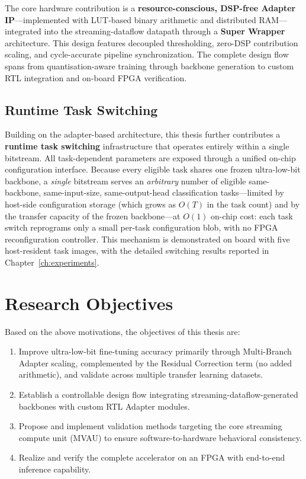 \documentclass[12pt, a4paper]{report}
\numberwithin{equation}{chapter}
\numberwithin{figure}{chapter}
\numberwithin{table}{chapter}
\numberwithin{algorithm}{chapter}
\begin{document}
The core hardware contribution is a \textbf{resource-conscious, DSP-free Adapter IP}---implemented with LUT-based binary arithmetic and distributed RAM---integrated into the streaming-dataflow datapath through a \textbf{Super Wrapper} architecture. This design features decoupled thresholding, zero-DSP contribution scaling, and cycle-accurate pipeline synchronization. The complete design flow spans from quantisation-aware training through backbone generation to custom RTL integration and on-board FPGA verification.

\subsection{Runtime Task Switching}

Building on the adapter-based architecture, this thesis further contributes a \textbf{runtime task switching} infrastructure that operates entirely within a single bitstream. All task-dependent parameters are exposed through a unified on-chip configuration interface. Because every eligible task shares one frozen ultra-low-bit backbone, a \emph{single} bitstream serves an \emph{arbitrary} number of eligible same-backbone, same-input-size, same-output-head classification tasks---limited by host-side configuration storage (which grows as $O(T)$ in the task count) and by the transfer capacity of the frozen backbone---at $O(1)$ on-chip cost: each task switch reprograms only a small per-task configuration blob, with no FPGA reconfiguration controller. This mechanism is demonstrated on board with five host-resident task images, with the detailed switching results reported in Chapter~\ref{ch:experiments}.

\section{Research Objectives}

Based on the above motivations, the objectives of this thesis are:

\begin{enumerate}
  \item Improve ultra-low-bit fine-tuning accuracy primarily through Multi-Branch Adapter scaling, complemented by the Residual Correction term (no added arithmetic), and validate across multiple transfer learning datasets.
  \item Establish a controllable design flow integrating streaming-dataflow-generated backbones with custom RTL Adapter modules.
  \item Propose and implement validation methods targeting the core streaming compute unit (MVAU) to ensure software-to-hardware behavioral consistency.
  \item Realize and verify the complete accelerator on an FPGA with end-to-end inference capability.
\end{enumerate}
\end{document}
